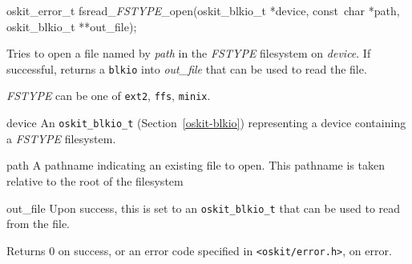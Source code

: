 \begin{apisyn}

	\funcproto oskit_error_t fsread_\emph{FSTYPE}_open(oskit_blkio_t *device,
				const~char *path,
				\outparam oskit_blkio_t **out_file);
\end{apisyn}
\begin{apidesc}
	Tries to open a file named by \emph{path} in the
	\emph{FSTYPE} filesystem
	on \emph{device}.
	If successful, returns a \texttt{blkio} into \emph{out_file}
	that can be used to read the file.

	\emph{FSTYPE} can be one of \texttt{ext2}, \texttt{ffs}, \texttt{minix}.
\end{apidesc}
\begin{apiparm}
	\item[device]
		An \texttt{oskit_blkio_t} (Section~\ref{oskit-blkio})
		representing a device containing a \emph{FSTYPE} filesystem.
	\item[path]
		A pathname indicating an existing file to open.
		This pathname is taken relative to the root of the filesystem
	\item[out_file]
		Upon success, this is set to an \texttt{oskit_blkio_t}
		that can be used to read from the file.
\end{apiparm}
\begin{apiret}
	Returns 0 on success, or an error code specified in
	{\tt <oskit/error.h>}, on error.
\end{apiret}
